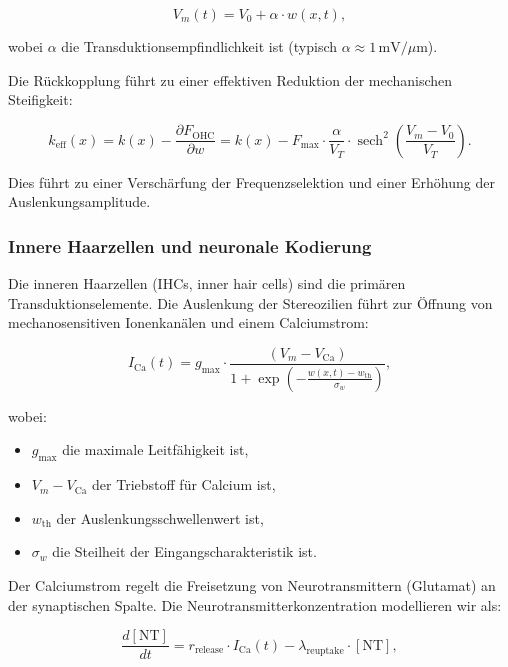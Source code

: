 ﻿\documentclass[12pt, a4paper]{article}
\theoremstyle{definition}
\theoremstyle{remark}
\begin{document}
\begin{equation}
\label{eq:stereocilia_transduction}
V_m(t) = V_0 + \alpha \cdot w(x,t),
\end{equation}

wobei $\alpha$ die Transduktionsempfindlichkeit ist (typisch $\alpha \approx 1 
\, \mathrm{mV}/\mu\mathrm{m}$).

Die Rückkopplung führt zu einer effektiven Reduktion der mechanischen Steifigkeit:

\begin{equation}
\label{eq:ohc_stiffness_reduction}
k_{\mathrm{eff}}(x) = k(x) - \frac{\partial F_{\mathrm{OHC}}}{\partial w} 
= k(x) - F_{\max} \cdot \frac{\alpha}{V_T} \cdot \operatorname{sech}^2\left( 
\frac{V_m - V_0}{V_T} \right).
\end{equation}

Dies führt zu einer Verschärfung der Frequenzselektion und einer 
Erhöhung der Auslenkungsamplitude.

\subsubsection{Innere Haarzellen und neuronale Kodierung}

Die inneren Haarzellen (IHCs, inner hair cells) sind die primären 
Transduktionselemente. Die Auslenkung der Stereozilien führt zur Öffnung 
von mechanosensitiven Ionenkanälen und einem Calciumstrom:

\begin{equation}
\label{eq:ihc_transduction}
I_{\mathrm{Ca}}(t) = g_{\max} \cdot \frac{(V_m - V_{\mathrm{Ca}})}{1 + 
\exp\left( -\frac{w(x,t) - w_{\mathrm{th}}}{\sigma_w} \right)},
\end{equation}

wobei:
\begin{itemize}
\item $g_{\max}$ die maximale Leitfähigkeit ist,
\item $V_m - V_{\mathrm{Ca}}$ der Triebstoff für Calcium ist,
\item $w_{\mathrm{th}}$ der Auslenkungsschwellenwert ist,
\item $\sigma_w$ die Steilheit der Eingangscharakteristik ist.
\end{itemize}

Der Calciumstrom regelt die Freisetzung von Neurotransmittern (Glutamat) 
an der synaptischen Spalte. Die Neurotransmitterkonzentration modellieren 
wir als:

\begin{equation}
\label{eq:neurotransmitter}
\frac{d[\mathrm{NT}]}{dt} = r_{\mathrm{release}} \cdot I_{\mathrm{Ca}}(t) 
- \lambda_{\mathrm{reuptake}} \cdot [\mathrm{NT}],
\end{equation}
\end{document}
